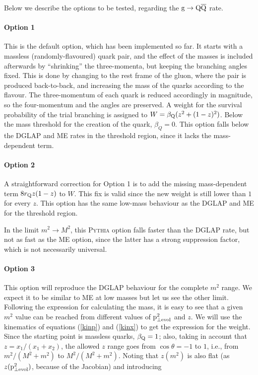 \documentclass[a4paper,12pt]{article}
\begin{document}
Below we describe the options to be tested, regarding the ${\mathrm g}\to{\mathrm Q}\overline{\mathrm Q}$ rate.

\paragraph{Option 1}

This is the default option, which has been implemented so far. It starts with a massless (randomly-flavoured) quark pair, and the effect of the masses is included afterwards by ``shrinking'' the three-momenta, but keeping the branching angles fixed. This is done by changing to the rest frame of the gluon, where the pair is produced back-to-back, and increasing the mass of the quarks according to the flavour. The three-momentum of each quark is reduced accordingly in magnitude, so the four-momentum and the angles are preserved. A weight for the survival probability of the trial branching is assigned to $W=\beta_{\mathrm Q}(z^2+(1-z)^2)$. Below the mass threshold for the creation of the quark, $\beta_Q=0$. This option falls below the DGLAP and ME rates in the threshold region, since it lacks the mass-dependent term.

\paragraph{Option 2}

A straightforward correction for Option 1 is to add the missing mass-dependent term $8r_{\mathrm Q} z(1-z)$ to $W$. This fix is valid since the new weight is still lower than $1$ for every $z$. This option has the same low-mass behaviour as the DGLAP and ME for the threshold region.

In the limit $m^2\to M^2$, this \textsc{Pythia} option falls faster than the DGLAP rate, but not as fast as the ME option, since the latter has a strong suppression factor, which is not necessarily universal. 

\paragraph{Option 3}

This option will reproduce the DGLAP behaviour for the complete $m^2$ range. We expect it to be similar to ME at low masses but let us see the other limit. Following the expression for calculating the mass, it is easy to see that a given $m^2$ value can be reached from different values of ${\mathrm p}^2_{\perp\mathrm{evol}}$ and $z$. We will use the kinematics of equations (\ref{kinp}) and (\ref{kinx}) to get  the expression for the weight. Since the starting point is massless quarks, $\beta_{\mathrm Q}=1$; also, taking in account that $z=x_1/(x_1+x_2)$, the allowed $z$ range goes from $\cos\theta=-1$ to $1$, i.e., from $m^2/(M^2+m^2)$ to $M^2/(M^2+m^2)$. Noting that $z(m^2)$ is also flat (as $z({\mathrm p}^2_{\perp\mathrm{evol}})$, because of the Jacobian) and introducing 
\end{document}
